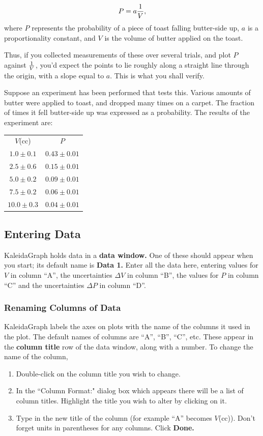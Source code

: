 $$P = a{1 \over V}, $$ where $P$ represents the probability of a piece
of toast falling butter-side up, $a$ is a proportionality constant,
and $V$ is the volume of butter applied on the toast.

Thus, if you collected measurements of these over several trials, and plot $P$ against ${1 \over V}$, you'd expect the points to lie roughly along a straight line through the origin, with a slope equal to $a$. This is what you shall verify.

Suppose an experiment has been performed that tests this. Various amounts of butter were applied to toast, and dropped many times on a carpet. The fraction of times it fell butter-side up was expressed as a probability. The results of the experiment are:
\begin{center}
\begin{tabular}{|c|c|}
\hline
$V$(cc) & $P$ \\ $1.0 \pm 0.1$ & $0.43 \pm 0.01$ \\ $2.5 \pm 0.6$ & $0.15
\pm 0.01$ \\ $5.0 \pm 0.2$ & $0.09 \pm 0.01$ \\ $7.5 \pm 0.2$ & $0.06 \pm
0.01$ \\ $10.0 \pm 0.3$ & $0.04 \pm 0.01$ \\
\hline
\end{tabular}
\end{center}  


\subsection {Entering Data}
KaleidaGraph holds data in a {\bf data window.} One of these should
appear when you start; its default name is {\bf Data 1.} Enter all the data here, entering values for $V$ in column ``A'',
the uncertainties $\Delta V$ in column ``B'', the values for $P$ in column ``C'' 
and the uncertainties $\Delta P$ in column ``D''.


\subsubsection{Renaming Columns of Data}

KaleidaGraph labels the axes on plots with the name of the columns it used in the plot. The default names of columns are ``A'', ``B'', ``C'', etc. These appear in
the {\bf column title} row of the data window, along with a number. To
change the name of the column,

\noindent
\begin{enumerate}
\item Double-click on the column title you wish to change.
\item In the ``Column Format:" dialog box which appears there will be a list of column 
titles. Highlight the title you wish to alter by clicking on it.
\item Type in the new title of the column (for example ``A'' becomes $V$(cc)). Don't forget units in parentheses for any columns. Click {\bf Done.}
\end{enumerate}

